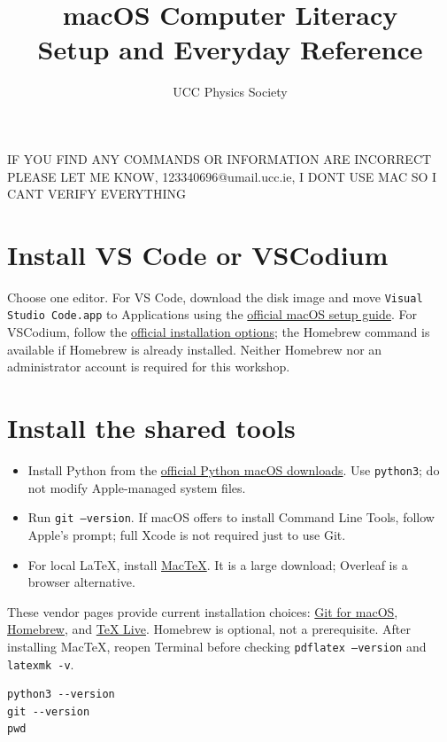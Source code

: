 \documentclass[11pt]{article}
\title{macOS Computer Literacy\\Setup and Everyday Reference}
\author{UCC Physics Society}
\begin{document}
\maketitle

\LARGE{IF YOU FIND ANY COMMANDS OR INFORMATION ARE INCORRECT PLEASE LET ME KNOW, 123340696@umail.ucc.ie, I DONT USE MAC SO I CANT VERIFY EVERYTHING}

\tableofcontents
\section{Install VS Code or VSCodium}
Choose one editor. For VS Code, download the disk image and move
\texttt{Visual Studio Code.app} to Applications using the
\href{https://code.visualstudio.com/docs/setup/mac}{official macOS setup
guide}. For VSCodium, follow the
\href{https://vscodium.com/#install}{official installation options}; the
Homebrew command is available if Homebrew is already installed. Neither
Homebrew nor an administrator account is required for this workshop.

\section{Install the shared tools}
\begin{itemize}
\item Install Python from the
\href{https://www.python.org/downloads/macos/}{official Python macOS
downloads}. Use \texttt{python3}; do not modify Apple-managed system files.
\item Run \texttt{git --version}. If macOS offers to install Command Line
Tools, follow Apple's prompt; full Xcode is not required just to use Git.
\item For local LaTeX, install
\href{https://tug.org/mactex/}{MacTeX}. It is a large download; Overleaf is a
browser alternative.
\end{itemize}
These vendor pages provide current installation choices:
\href{https://git-scm.com/download/mac}{Git for macOS},
\href{https://brew.sh/}{Homebrew}, and
\href{https://tug.org/texlive/}{TeX Live}. Homebrew is optional, not a
prerequisite. After installing MacTeX, reopen Terminal before checking
\texttt{pdflatex --version} and \texttt{latexmk -v}.

\begin{lstlisting}
python3 --version
git --version
pwd
\end{lstlisting}


\newpage
\end{document}

